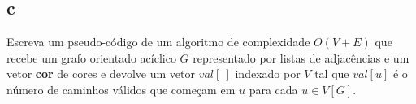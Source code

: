 \subsection{c} Escreva um pseudo-código de um algoritmo de complexidade $O(V +E)$ que recebe um grafo orientado acíclico $G$ representado por listas de adjacências e um vetor \textbf{cor} de cores e devolve um vetor $val[~]$ indexado por $V$ tal que $val[u]$ é o número de caminhos válidos que começam em $u$ para cada $u \in V[G]$.

\itemdsep[0.25]
